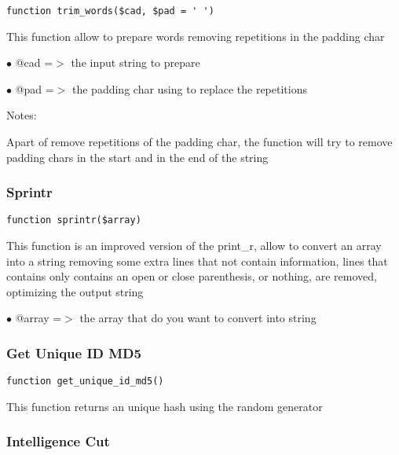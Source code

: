 \documentclass[a4paper]{article}
\begin{document}
\begin{lstlisting}
function trim_words($cad, $pad = ' ')
\end{lstlisting}

This function allow to prepare words removing repetitions in the padding char

\begin{compactitem}
\item[\color{myblue}$\bullet$] @cad =$>$ the input string to prepare
\item[\color{myblue}$\bullet$] @pad =$>$ the padding char using to replace the repetitions
\end{compactitem}

Notes:

Apart of remove repetitions of the padding char, the function will try to
remove padding chars in the start and in the end of the string

\hypertarget{toc240}{}
\subsubsection{Sprintr}

\begin{lstlisting}
function sprintr($array)
\end{lstlisting}

This function is an improved version of the print\_r, allow to convert an
array into a string removing some extra lines that not contain information,
lines that contains only contains an open or close parenthesis, or nothing,
are removed, optimizing the output string

\begin{compactitem}
\item[\color{myblue}$\bullet$] @array =$>$ the array that do you want to convert into string
\end{compactitem}

\hypertarget{toc241}{}
\subsubsection{Get Unique ID MD5}

\begin{lstlisting}
function get_unique_id_md5()
\end{lstlisting}

This function returns an unique hash using the random generator

\hypertarget{toc242}{}
\subsubsection{Intelligence Cut}
\end{document}
